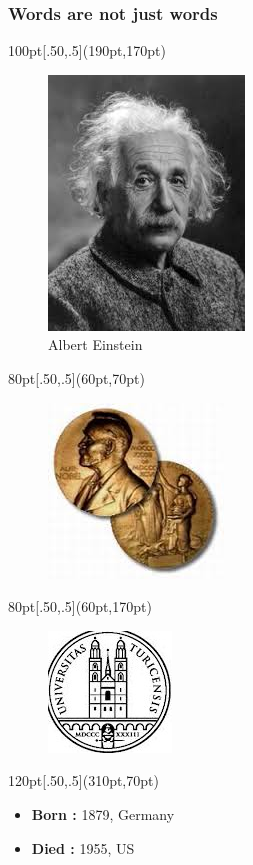 \documentclass{beamer}
\begin{document}
\begin{frame}
 \frametitle{Words are not just words}
\begin{textblock*}{100pt}[.50,.5](190pt,170pt)
\begin{figure}[h]
 \centering
 \includegraphics[bb=0 0 197 256,scale=0.5]{./einstein.jpg}
 \caption{Albert Einstein}
\end{figure}
\end{textblock*}
\begin{textblock*}{80pt}[.50,.5](60pt,70pt)
\begin{figure}[h]
 \centering
 \includegraphics[bb=0 0 197 256,scale=0.5]{./nobel.jpg}
\end{figure}
\end{textblock*}

\begin{textblock*}{80pt}[.50,.5](60pt,170pt)
\begin{figure}[h]
 \centering
 \includegraphics[bb=0 0 197 256,scale=0.5]{./zurich.jpg}
\end{figure}
\end{textblock*}


\begin{textblock*}{120pt}[.50,.5](310pt,70pt)
\begin{itemize} 
\item \textbf{Born :} 1879, Germany
\item \textbf{Died :} 1955, US
 \end{itemize}
\end{textblock*}
\end{frame}
\end{document}
